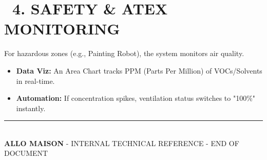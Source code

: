 \documentclass[11pt,a4paper]{article}
\begin{document}
\vspace{0.5cm}

\section*{\faShieldAlt\ 4. SAFETY \& ATEX MONITORING}
For hazardous zones (e.g., Painting Robot), the system monitors air quality.
\begin{itemize}
    \item \textbf{Data Viz:} An Area Chart tracks PPM (Parts Per Million) of VOCs/Solvents in real-time.
    \item \textbf{Automation:} If concentration spikes, ventilation status switches to "100\%" instantly.
\end{itemize}

\vfill
\begin{center}
    \rule{\textwidth}{0.5pt}\\
    \vspace{0.2cm}
    \textbf{ALLO MAISON} - INTERNAL TECHNICAL REFERENCE - END OF DOCUMENT
\end{center}
\end{document}
